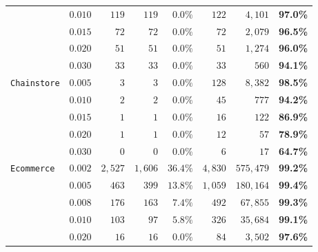 \documentclass[runningheads]{llncs}
\begin{document}
\begin{table}[htbp]
{\begin{tabular}{lrrrrrrr}
                    & $0.010$ & $119$     & $119$     & $0.0\%$  & $122$     & $4{,}101$  & \textbf{97.0\%} \\
                    & $0.015$ & $72$      & $72$      & $0.0\%$  & $72$      & $2{,}079$  & \textbf{96.5\%} \\
                    & $0.020$ & $51$      & $51$      & $0.0\%$  & $51$      & $1{,}274$  & \textbf{96.0\%} \\
                    & $0.030$ & $33$      & $33$      & $0.0\%$  & $33$      & $560$      & \textbf{94.1\%} \\
\midrule
\texttt{Chainstore} & $0.005$ & $3$       & $3$       & $0.0\%$  & $128$     & $8{,}382$  & \textbf{98.5\%} \\
                    & $0.010$ & $2$       & $2$       & $0.0\%$  & $45$      & $777$      & \textbf{94.2\%} \\
                    & $0.015$ & $1$       & $1$       & $0.0\%$  & $16$      & $122$      & \textbf{86.9\%} \\
                    & $0.020$ & $1$       & $1$       & $0.0\%$  & $12$      & $57$       & \textbf{78.9\%} \\
                    & $0.030$ & $0$       & $0$       & $0.0\%$  & $6$       & $17$       & \textbf{64.7\%} \\
\midrule
\texttt{Ecommerce}  & $0.002$ & $2{,}527$ & $1{,}606$ & $36.4\%$ & $4{,}830$ & $575{,}479$ & \textbf{99.2\%} \\
                    & $0.005$ & $463$     & $399$     & $13.8\%$ & $1{,}059$ & $180{,}164$ & \textbf{99.4\%} \\
                    & $0.008$ & $176$     & $163$     & $7.4\%$  & $492$     & $67{,}855$  & \textbf{99.3\%} \\
                    & $0.010$ & $103$     & $97$      & $5.8\%$  & $326$     & $35{,}684$  & \textbf{99.1\%} \\
                    & $0.020$ & $16$      & $16$      & $0.0\%$  & $84$      & $3{,}502$   & \textbf{97.6\%} \\
\bottomrule
\end{tabular}
}
\end{table}
\end{document}

